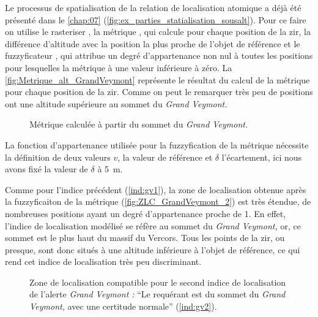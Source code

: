 Le processus de spatialisation de la relation de localisation atomique
 a déjà été présenté dans le
\autoref{chap:07}
(\autoref{fig:ex_parties_statialisation_sousalt}). Pour ce faire on
utilise le rasteriser , la métrique
, qui calcule pour chaque position de
la \ac{zir}, la différence d'altitude avec la position la plus proche
de l'objet de référence et le fuzzyficateur ,
qui attribue un degré d'appartenance non nul à toutes les positions
pour lesquelles la métrique à une valeur inférieure à zéro. La
\autoref{fig:Metrique_alt_GrandVeymont} représente le résultat du
calcul de la métrique pour chaque position de la \ac{zir}. Comme on
peut le remarquer très peu de positions ont une altitude supérieure au
sommet du \emph{Grand Veymont.}

\begin{figure}
  \centering
  
  \caption{Métrique \protect{} calculée
    à partir du sommet du \emph{Grand Veymont.}}
  \label{fig:Metrique_alt_GrandVeymont}
\end{figure}

La fonction d'appartenance utilisée pour la fuzzyfication de la
métrique nécessite la définition de deux valeurs \(v\), la valeur de
référence et \(\delta\) l'écartement, ici nous avons fixé la valeur de
\(\delta\) à \SI{5}{\meter}.

%   

Comme pour l'indice précédent (\ref{ind:gv1}), la zone de localisation
obtenue après la fuzzyficaiton de la métrique
(\autoref{fig:ZLC_GrandVeymont_2}) est très étendue, de nombreuses
positions ayant un degré d'appartenance proche de 1. En effet,
l'indice de localisation modélisé se réfère au sommet du \emph{Grand
  Veymont,} or, ce sommet est le plus haut du massif du Vercors. Tous
les points de la \ac{zir}, ou presque, sont donc situés à une altitude
inférieure à l'objet de référence, ce qui rend cet indice de
localisation très peu discriminant.

\begin{figure}
  \centering
  
  \caption{Zone de localisation compatible pour le second indice de
    localisation de l'alerte \emph{Grand Veymont :} \enquote{Le
      requérant est \protect{} du sommet du
      \emph{Grand Veymont,} avec une certitude normale}
    (\ref{ind:gv2}).}
  \label{fig:ZLC_GrandVeymont_2}
\end{figure}

